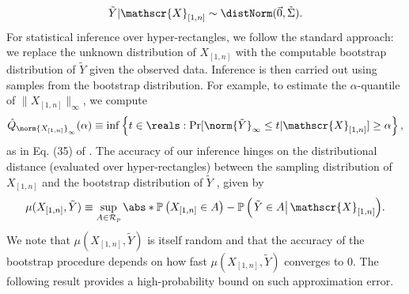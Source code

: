 \documentclass[aos]{imsart}
\begin{document}
\begin{equation*}
    \tilde{Y} | \mathscr{X}_{[1,n]} \sim \distNorm(\vec{0}, \tilde\Sigma).
\end{equation*}
For statistical inference over hyper-rectangles, we follow the standard approach: we replace the unknown distribution of $X_{[1,n]}$ with the computable bootstrap distribution of $\tilde{Y}$ given the observed data. Inference is then carried out using samples from the bootstrap distribution. For example, to estimate the $\alpha$-quantile of $\lVert X_{[1,n]} \rVert_\infty$, we compute
\begin{equation*}
    \hat{Q}_{\norm{X_{[1,n]}}_\infty}(\alpha) 
    \equiv \inf\left\{ t \in \reals: \Pr[\norm{\tilde{Y}}_\infty \leq t | \mathscr{X}_{[1,n]}] \geq \alpha \right\},
\end{equation*}
as in Eq. (35) of \citet{zhang2014bootstrapping}. 
The accuracy of our inference hinges on the distributional distance (evaluated over hyper-rectangles) between the sampling distribution of $X_{[1,n]}$ and the bootstrap distribution of $\tilde{Y}$ \citep[Eq. (38)]{zhang2014bootstrapping}, given by
\begin{equation*}
    \mu(X_{[1,n]}, \tilde{Y}) \equiv \sup_{A \in \mathcal{R}_p} \abs*{ \mathbb{P} \left( X_{[1,n]} \in A \right) - \mathbb{P} \left( \left. \tilde{Y} \in A  \right| \mathscr{X}_{[1,n]} \right) }.
\end{equation*}
We note that $\mu(X_{[1,n]}, \tilde{Y})$ is itself random and that the accuracy of the bootstrap procedure depends on how fast $\mu(X_{[1,n]}, \tilde{Y})$ converges to $0$. The following result provides a high-probability bound on such approximation error. %
\end{document}
